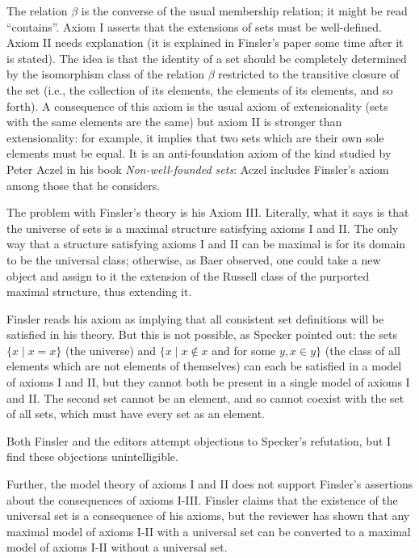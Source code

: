 The relation $\beta$ is the converse of the usual membership relation;
it might be read ``contains''.  Axiom I asserts that the extensions of
sets must be well-defined.  Axiom II needs explanation (it is
explained in Finsler's paper some time after it is stated).  The idea
is that the identity of a set should be completely determined by the
isomorphism class of the relation $\beta$ restricted to the transitive
closure of the set (i.e., the collection of its elements, the elements
of its elements, and so forth).  A consequence of this axiom is the
usual axiom of extensionality (sets with the same elements are the
same) but axiom II is stronger than extensionality: for example, it
implies that two sets which are their own sole elements must be equal.
It is an anti-foundation axiom of the kind studied by Peter Aczel in
his book {\em Non-well-founded sets\/}: Aczel includes Finsler's axiom
among those that he considers.

The problem with Finsler's theory is his Axiom III.  Literally, what
it says is that the universe of sets is a maximal structure satisfying
axioms I and II.  The only way that a structure satisfying axioms I
and II can be maximal is for its domain to be the universal class;
otherwise, as Baer observed, one could take a new object and assign to
it the extension of the Russell class of the purported maximal
structure, thus extending it.

Finsler reads his axiom as implying that all consistent set
definitions will be satisfied in his theory.  But this is not
possible, as Specker pointed out: the sets $\{x \mid x = x\}$ (the
universe) and $\{x \mid x \not\in x $ and for some $y, x \in y\}$
(the class of all elements which are not elements of themselves) can
each be satisfied in a model of axioms I and II, but they cannot both
be present in a single model of axioms I and II.  The second set
cannot be an element, and so cannot coexist with the set of all sets,
which must have every set as an element.

Both Finsler and the editors attempt objections to Specker's
refutation, but I find these objections unintelligible.

Further, the model theory of axioms I and II does not support
Finsler's assertions about the consequences of axioms I-III.  Finsler
claims that the existence of the universal set is a consequence of his
axioms, but the reviewer has shown that any maximal model of axioms
I-II with a universal set can be converted to a maximal model of
axioms I-II without a universal set.

